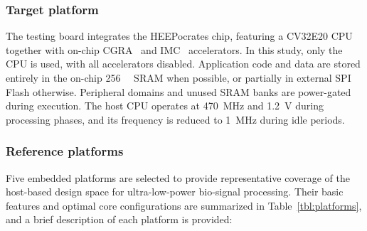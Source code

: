             \subsubsection*{Target platform}

                The testing board integrates the \mbox{HEEPocrates} chip, featuring a CV32E20 CPU~\cite{zeroriscy} together with on-chip CGRA~\cite{oe-cgra} and IMC~\cite{blade} accelerators. In this study, only the CPU is used, with all accelerators disabled. Application code and data are stored entirely in the on-chip \SI{256}{\kibi\byte} SRAM when possible, or partially in external SPI Flash otherwise. Peripheral domains and unused SRAM banks are power-gated during execution. The host CPU operates at \SI{470}{\mega\hertz} and \SI{1.2}{\volt} during processing phases, and its frequency is reduced to \SI{1}{\mega\hertz} during idle periods.
            
            \subsubsection*{Reference platforms}
            
                Five embedded platforms are selected to provide representative coverage of the host-based design space for ultra-low-power bio-signal processing. Their basic features and optimal core configurations are summarized in Table~\ref{tbl:platforms}, and a brief description of each platform is provided:

